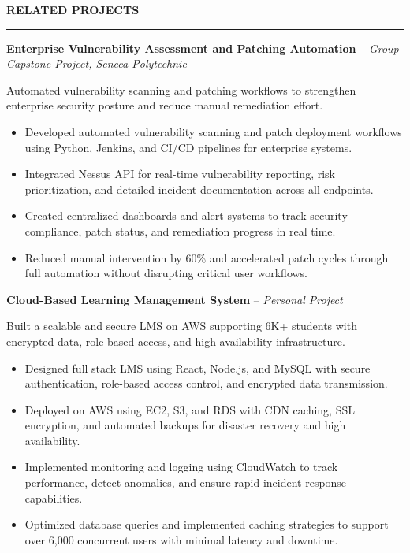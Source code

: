 \documentclass[10pt,letterpaper]{article}
\begin{document}
\vspace{6pt}

\textbf{RELATED PROJECTS}\\[-8pt]
\noindent\rule{\textwidth}{1pt}

\vspace{-2pt}

\textbf{Enterprise Vulnerability Assessment and Patching Automation} -- \emph{Group Capstone Project, Seneca Polytechnic }

\vspace{-1pt}

Automated vulnerability scanning and patching workflows to strengthen enterprise security posture and reduce manual remediation effort.
\vspace{-1pt}
\begin{itemize}
\item Developed automated vulnerability scanning and patch deployment workflows using Python, Jenkins, and CI/CD pipelines for enterprise systems.
\item Integrated Nessus API for real-time vulnerability reporting, risk prioritization, and detailed incident documentation across all endpoints.
\item Created centralized dashboards and alert systems to track security compliance, patch status, and remediation progress in real time.
\item Reduced manual intervention by 60\% and accelerated patch cycles through full automation without disrupting critical user workflows.
\end{itemize}

\textbf{Cloud-Based Learning Management System} -- \emph{Personal Project}

\vspace{-1pt}

Built a scalable and secure LMS on AWS supporting 6K+ students with encrypted data, role-based access, and high availability infrastructure.
\vspace{-1pt}
\begin{itemize}
\item Designed full stack LMS using React, Node.js, and MySQL with secure authentication, role-based access control, and encrypted data transmission.
\item Deployed on AWS using EC2, S3, and RDS with CDN caching, SSL encryption, and automated backups for disaster recovery and high availability.
\item Implemented monitoring and logging using CloudWatch to track performance, detect anomalies, and ensure rapid incident response capabilities.
\item Optimized database queries and implemented caching strategies to support over 6,000 concurrent users with minimal latency and downtime.
\end{itemize}
\end{document}
